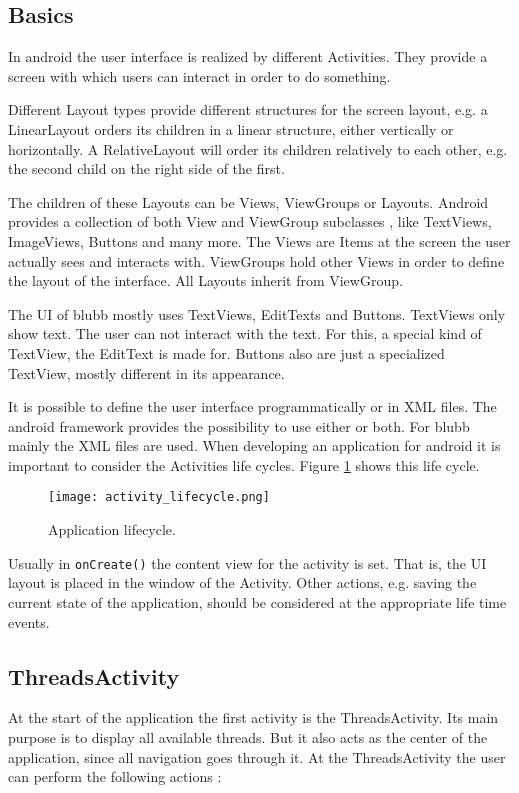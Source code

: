 \documentclass[12pt,a4paper,oneside]{report}
\newcommand{\appname}{blubb}
\newcommand{\code}[1]{\lstinline{#1}}
\begin{document}
\subsection{Basics}
In android the user interface is realized by different Activities. They provide a screen with which users can interact in order to do something\citep{aDefActivities}.


 Different Layout types provide different structures for the screen layout, e.g. a LinearLayout orders its  children in a linear structure, either vertically or horizontally. A RelativeLayout will order its children relatively to each other, e.g. the second child on the right side of the first.
 
 The children of these Layouts can be Views, ViewGroups or Layouts. Android provides a collection of both View and ViewGroup subclasses \citep{aDefUIOV}, like TextViews, ImageViews, Buttons and many more. The Views are Items at the screen the user actually sees and interacts with. ViewGroups hold other Views in order to define the layout of the interface. All Layouts inherit from ViewGroup.
 
The UI of \appname{} mostly uses TextViews, EditTexts and Buttons. TextViews only show text. The user can not interact with the text. For this, a special kind of TextView, the EditText is made for. Buttons also are just a specialized TextView, mostly different in its appearance. 


It is possible to define the user interface programmatically or in XML files. The android framework provides the possibility to use either or both. For \appname{} mainly the XML files are used. 
When developing an application for android it is important to consider the Activities life cycles. Figure \ref{fig:activitylivecycle} shows this life cycle.
 
\begin{figure}[!ht]
    \texttt{[image: activity\_lifecycle.png]}
	\caption{Application lifecycle.} 
	\label{fig:activitylivecycle}
\end{figure}

Usually in \code{onCreate()} the content view for the activity is set. That is, the UI layout is placed in the window of the Activity. Other actions, e.g. saving the current state of the application, should be considered at the appropriate life time events.

\subsection{ThreadsActivity}
At the start of the application the first activity is the ThreadsActivity.
Its main purpose is to display all available threads. 
But it also acts as the center of the application, since all navigation goes through it.
At the ThreadsActivity the user can perform the following actions :
\end{document}
